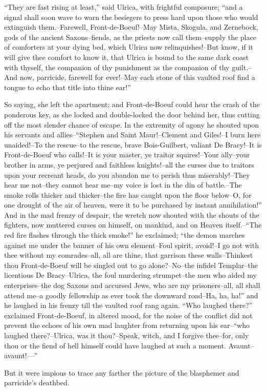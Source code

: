 ``They are fast rising at least,'' said Ulrica, with frightful
composure; ``and a signal shall soon wave to warn the besiegers to press
hard upon those who would extinguish them.--Farewell,
Front-de-Boeuf!--May Mista, Skogula, and Zernebock, gods of the ancient
Saxons--fiends, as the priests now call them--supply the place of
comforters at your dying bed, which Ulrica now relinquishes!--But know,
if it will give thee comfort to know it, that Ulrica is bound to the
same dark coast with thyself, the companion of thy punishment as the
companion of thy guilt.--And now, parricide, farewell for ever!--May
each stone of this vaulted roof find a tongue to echo that title into
thine ear!''

So saying, she left the apartment; and Front-de-Boeuf could hear the
crash of the ponderous key, as she locked and double-locked the door
behind her, thus cutting off the most slender chance of escape. In the
extremity of agony he shouted upon his servants and allies--``Stephen
and Saint Maur!--Clement and Giles!--I burn here unaided!--To the
rescue--to the rescue, brave Bois-Guilbert, valiant De Bracy!--It is
Front-de-Boeuf who calls!--It is your master, ye traitor squires!--Your
ally--your brother in arms, ye perjured and faithless knights!--all the
curses due to traitors upon your recreant heads, do you abandon me to
perish thus miserably!--They hear me not--they cannot hear me--my voice
is lost in the din of battle.--The smoke rolls thicker and thicker--the
fire has caught upon the floor below--O, for one drought of the air of
heaven, were it to be purchased by instant annihilation!'' And in the
mad frenzy of despair, the wretch now shouted with the shouts of the
fighters, now muttered curses on himself, on mankind, and on Heaven
itself.--``The red fire flashes through the thick smoke!'' he exclaimed;
``the demon marches against me under the banner of his own element--Foul
spirit, avoid!--I go not with thee without my comrades--all, all are
thine, that garrison these walls--Thinkest thou Front-de-Boeuf will be
singled out to go alone?--No--the infidel Templar--the licentious De
Bracy--Ulrica, the foul murdering strumpet--the men who aided my
enterprises--the dog Saxons and accursed Jews, who are my
prisoners--all, all shall attend me--a goodly fellowship as ever took
the downward road--Ha, ha, ha!'' and he laughed in his frenzy till the
vaulted roof rang again. ``Who laughed there?'' exclaimed
Front-de-Boeuf, in altered mood, for the noise of the conflict did not
prevent the echoes of his own mad laughter from returning upon his
ear--``who laughed there?--Ulrica, was it thou?--Speak, witch, and I
forgive thee--for, only thou or the fiend of hell himself could have
laughed at such a moment. Avaunt--avaunt!---''

But it were impious to trace any farther the picture of the blasphemer
and parricide's deathbed.
